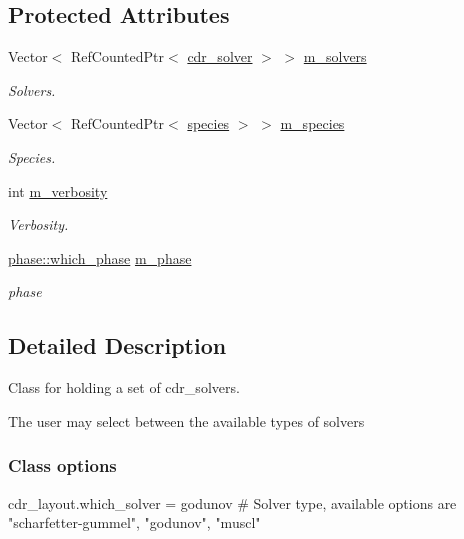 \subsection*{Protected Attributes}
\begin{DoxyCompactItemize}
\item 
Vector$<$ Ref\+Counted\+Ptr$<$ \hyperlink{classcdr__solver}{cdr\+\_\+solver} $>$ $>$ \hyperlink{classcdr__layout_a9811b0266919332a196177d7bee7e49f}{m\+\_\+solvers}
\begin{DoxyCompactList}\small\item\em Solvers. \end{DoxyCompactList}\item 
Vector$<$ Ref\+Counted\+Ptr$<$ \hyperlink{classspecies}{species} $>$ $>$ \hyperlink{classcdr__layout_a7a7c5d00661c158f026852fd2c88e310}{m\+\_\+species}
\begin{DoxyCompactList}\small\item\em Species. \end{DoxyCompactList}\item 
int \hyperlink{classcdr__layout_a0f5e1ccac2be9b4135b10bc94cf6b2c3}{m\+\_\+verbosity}
\begin{DoxyCompactList}\small\item\em Verbosity. \end{DoxyCompactList}\item 
\hyperlink{namespacephase_a23c76f548a5eb1955ed8c929c541108b}{phase\+::which\+\_\+phase} \hyperlink{classcdr__layout_a08fecf36b3d6a5122615771ea2028c67}{m\+\_\+phase}
\begin{DoxyCompactList}\small\item\em phase \end{DoxyCompactList}\end{DoxyCompactItemize}


\subsection{Detailed Description}
Class for holding a set of cdr\+\_\+solvers. 

The user may select between the available types of solvers

\subsubsection*{Class options }

\begin{DoxyVerb}cdr_layout.which_solver = godunov    # Solver type, available options are "scharfetter-gummel", "godunov", "muscl"\end{DoxyVerb}
 

